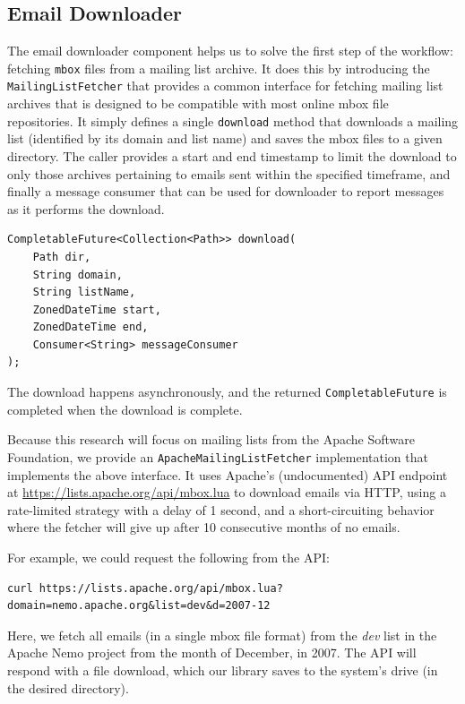 \documentclass[a4paper, 12pt]{article}
\begin{document}
	\newpage
	\subsection{Email Downloader}
		\label{sec:email-downloader}
		The email downloader component helps us to solve the first step of the workflow: fetching \texttt{mbox} files from a mailing list archive. It does this by introducing the \texttt{MailingListFetcher} that provides a common interface for fetching mailing list archives that is designed to be compatible with most online mbox file repositories. It simply defines a single \texttt{download} method that downloads a mailing list (identified by its domain and list name) and saves the mbox files to a given directory. The caller provides a start and end timestamp to limit the download to only those archives pertaining to emails sent within the specified timeframe, and finally a message consumer that can be used for downloader to report messages as it performs the download.
		
		\begin{verbatim}
CompletableFuture<Collection<Path>> download(
	Path dir,
	String domain,
	String listName,
	ZonedDateTime start,
	ZonedDateTime end,
	Consumer<String> messageConsumer
);
		\end{verbatim}
	
		The download happens asynchronously, and the returned \texttt{CompletableFuture} is completed when the download is complete.
		
		Because this research will focus on mailing lists from the Apache Software Foundation, we provide an \texttt{ApacheMailingListFetcher} implementation that implements the above interface. It uses Apache's (undocumented) API endpoint at \href{https://lists.apache.org/api/mbox.lua}{https://lists.apache.org/api/mbox.lua} to download emails via HTTP, using a rate-limited strategy with a delay of 1 second, and a short-circuiting behavior where the fetcher will give up after 10 consecutive months of no emails.
		
		For example, we could request the following from the API:
		
		\begin{verbatim}
curl https://lists.apache.org/api/mbox.lua?domain=nemo.apache.org&list=dev&d=2007-12
		\end{verbatim}
		
		Here, we fetch all emails (in a single mbox file format) from the \textit{dev} list in the Apache Nemo project from the month of December, in 2007. The API will respond with a file download, which our library saves to the system's drive (in the desired directory).
		
\end{document}
